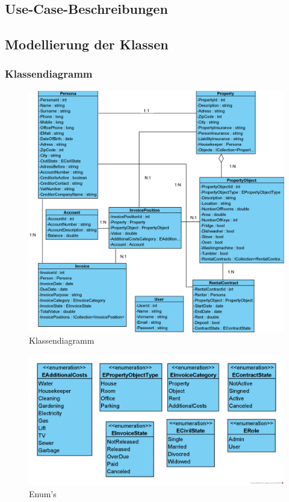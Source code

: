 \subsection{Use-Case-Beschreibungen}


\newpage
\subsection{Modellierung der Klassen}
\subsubsection{Klassendiagramm}
\begin{figure}[H]
  \begin{center}
    \includegraphics[width=0.9\linewidth]{content/diagrams/out/classdiagram/classdiagram.png}
    \caption{Klassendiagramm}
    \label{classdiagramm}
  \end{center}
\end{figure}

\vspace*{-1cm}

\begin{figure}[H]
  \begin{center}
    \includegraphics[width=0.65\linewidth]{content/diagrams/out/classdiagram/Enums.png}
    \caption{Enum's}
    \label{enums}
  \end{center}
\end{figure}


